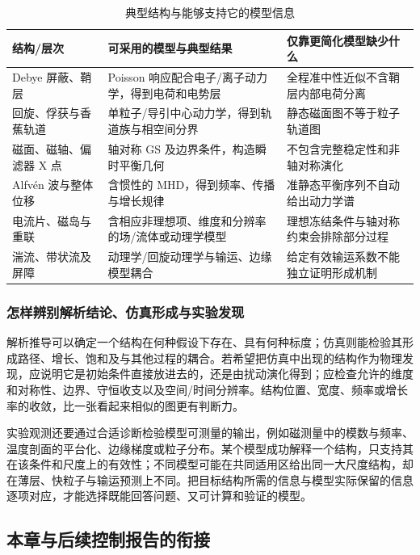 \documentclass[12pt,fontset=none]{ctexart}
\numberwithin{equation}{section}
\numberwithin{table}{section}
\numberwithin{figure}{section}
\begin{document}
\begin{table}[htbp]
\centering\small
\caption{典型结构与能够支持它的模型信息}\label{tab:micro-hierarchy}
\begin{tabular}{L{2.1cm}L{5.4cm}L{6.0cm}}
\toprule 结构/层次 & 可采用的模型与典型结果 & 仅靠更简化模型缺少什么 \\
\midrule
Debye 屏蔽、鞘层 & Poisson 响应配合电子/离子动力学，得到电荷和电势层 & 全程准中性近似不含鞘层内部电荷分离 \\
回旋、俘获与香蕉轨道 & 单粒子/导引中心动力学，得到轨道族与相空间分界 & 静态磁面图不等于粒子轨道图 \\
磁面、磁轴、偏滤器 X 点 & 轴对称 GS 及边界条件，构造瞬时平衡几何 & 不包含完整稳定性和非轴对称演化 \\
Alfv\'en 波与整体位移 & 含惯性的 MHD，得到频率、传播与增长规律 & 准静态平衡序列不自动给出动力学谱 \\
电流片、磁岛与重联 & 含相应非理想项、维度和分辨率的场/流体或动理学模型 & 理想冻结条件与轴对称约束会排除部分过程 \\
湍流、带状流及屏障 & 动理学/回旋动理学与输运、边缘模型耦合 & 给定有效输运系数不能独立证明形成机制 \\
\bottomrule
\end{tabular}
\end{table}

\subsubsection{怎样辨别解析结论、仿真形成与实验发现}

解析推导可以确定一个结构在何种假设下存在、具有何种标度；仿真则能检验其形成路径、增长、饱和及与其他过程的耦合。若希望把仿真中出现的结构作为物理发现，应说明它是初始条件直接放进去的，还是由扰动演化得到；应检查允许的维度和对称性、边界、守恒收支以及空间/时间分辨率。结构位置、宽度、频率或增长率的收敛，比一张看起来相似的图更有判断力。

实验观测还要通过合适诊断检验模型可测量的输出，例如磁测量中的模数与频率、温度剖面的平台化、边缘梯度或粒子分布。某个模型成功解释一个结构，只支持其在该条件和尺度上的有效性；不同模型可能在共同适用区给出同一大尺度结构，却在薄层、快粒子与输运预测上不同。把目标结构所需的信息与模型实际保留的信息逐项对应，才能选择既能回答问题、又可计算和验证的模型。

\subsection{本章与后续控制报告的衔接}\label{sec:micro-reading}
\end{document}
